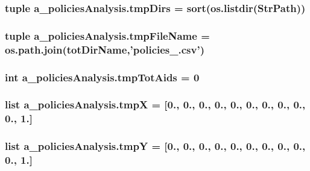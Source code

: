 \hypertarget{namespacea__policies_analysis_a8b85279e9a94c66530e0bd12ee099f1f}{
\subsubsection[{tmp\-Dirs}]{\setlength{\rightskip}{0pt plus 5cm}tuple a\-\_\-policies\-Analysis.\-tmp\-Dirs = sort(os.\-listdir({\bf Str\-Path}))}}\label{namespacea__policies_analysis_a8b85279e9a94c66530e0bd12ee099f1f}
\hypertarget{namespacea__policies_analysis_a657ce1f986af68f034a237ea05af0c5c}{
\subsubsection[{tmp\-File\-Name}]{\setlength{\rightskip}{0pt plus 5cm}tuple a\-\_\-policies\-Analysis.\-tmp\-File\-Name = os.\-path.\-join({\bf tot\-Dir\-Name},'policies\-\_.\-csv')}}\label{namespacea__policies_analysis_a657ce1f986af68f034a237ea05af0c5c}
\hypertarget{namespacea__policies_analysis_a32c9367895d62e7740179567b4c74fb5}{
\subsubsection[{tmp\-Tot\-Aids}]{\setlength{\rightskip}{0pt plus 5cm}int a\-\_\-policies\-Analysis.\-tmp\-Tot\-Aids = 0}}\label{namespacea__policies_analysis_a32c9367895d62e7740179567b4c74fb5}
\hypertarget{namespacea__policies_analysis_ae591a2d305f300c33b635d586bfe9af8}{
\subsubsection[{tmp\-X}]{\setlength{\rightskip}{0pt plus 5cm}list a\-\_\-policies\-Analysis.\-tmp\-X = \mbox{[}0., 0., 0., 0., 0., 0., 0., 0., 0., 0., 1.\mbox{]}}}\label{namespacea__policies_analysis_ae591a2d305f300c33b635d586bfe9af8}
\hypertarget{namespacea__policies_analysis_af38c7630b769a42480102e73bb8a6fe9}{
\subsubsection[{tmp\-Y}]{\setlength{\rightskip}{0pt plus 5cm}list a\-\_\-policies\-Analysis.\-tmp\-Y = \mbox{[}0., 0., 0., 0., 0., 0., 0., 0., 0., 0., 1.\mbox{]}}}\label{namespacea__policies_analysis_af38c7630b769a42480102e73bb8a6fe9}

